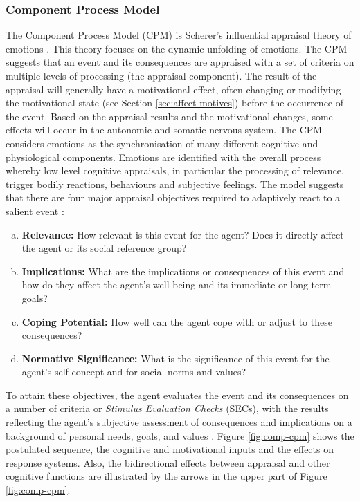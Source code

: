 \documentclass[12pt]{report}
\begin{document}
\subsubsection{Component Process Model}
\label{sec:cpm}

The Component Process Model (CPM) is Scherer's influential appraisal theory of
emotions
\cite{scherer:sequential-appraisal-process,scherer:appraisal-processes}. This
theory focuses on the dynamic unfolding of emotions. The CPM suggests that an
event and its consequences are appraised with a set of criteria on multiple
levels of processing (the appraisal component). The result of the appraisal will
generally have a motivational effect, often changing or modifying the
motivational state (see Section \ref{sec:affect-motives}) before the occurrence
of the event. Based on the appraisal results and the motivational changes, some
effects will occur in the autonomic and somatic nervous system. The CPM
considers emotions as the synchronisation of many different cognitive and
physiological components. Emotions are identified with the overall process
whereby low level cognitive appraisals, in particular the processing of
relevance, trigger bodily reactions, behaviours and subjective feelings. The
model suggests that there are four major appraisal objectives required to
adaptively react to a salient event \cite{scherer:dynamic-architecture-emotion}:

\begin{enumerate}[a)]
  \item \textbf{Relevance:} How relevant is this event for the agent? Does it
  directly affect the agent or its social reference group?
  \item \textbf{Implications:} What are the implications or consequences of this
  event and how do they affect the agent's well-being and its immediate or
  long-term goals?
  \item \textbf{Coping Potential:} How well can the agent cope with or adjust to
  these consequences?
  \item \textbf{Normative Significance:} What is the significance of this event
  for the agent's self-concept and for social norms and values?
\end{enumerate}

To attain these objectives, the agent evaluates the event and its consequences
on a number of criteria or \textit{Stimulus Evaluation Checks} (SECs), with the
results reflecting the agent’s subjective assessment of consequences and
implications on a background of personal needs, goals, and values
\cite{scherer:appraisal-processes}. Figure \ref{fig:comp-cpm} shows the
postulated sequence, the cognitive and motivational inputs and the effects on
response systems. Also, the bidirectional effects between appraisal and other
cognitive functions are illustrated by the arrows in the upper part of Figure
\ref{fig:comp-cpm}.
\end{document}
